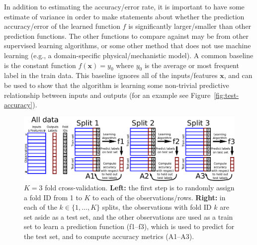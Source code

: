 \documentclass[12pt]{article}
\begin{document}
In addition to estimating the accuracy/error rate, it is important to
have some estimate of variance in order to make statements about
whether the prediction accuracy/error of the learned function $f$ is
significantly larger/smaller than other prediction functions. The
other functions to compare against may be from other supervised
learning algorithms, or some other method that does not use machine
learning (e.g., a domain-specific physical/mechanistic model). A common
baseline is the constant function $f(\mathbf x) = y_0$ where $y_0$ is
the average or most frequent label in the train data. This baseline
ignores all of the inputs/features $\mathbf x$, and can be used to
show that the algorithm is learning some non-trivial predictive relationship
between inputs and outputs (for an example see
Figure~\ref{fig:test-accuracy}).

\begin{figure}
  \centering
  \includegraphics[width=\textwidth]{drawing-cross-validation}
  \caption{$K=3$ fold cross-validation. \textbf{Left:} the first step
    is to randomly assign a fold ID from 1 to $K$ to each of the
    observations/rows. \textbf{Right:} in each of the
    $k\in\{1, \dots, K\}$ splits, the observations with fold ID $k$
    are set aside as a test set, and the other observations are used
    as a train set to learn a prediction function (f1--f3), which is
    used to predict for the test set, and to compute accuracy metrics
    (A1--A3).}
  \label{fig:cross-validation}
\end{figure}
\end{document}

